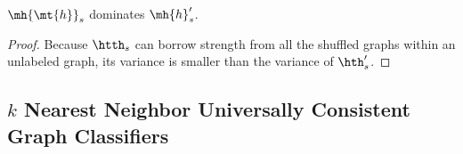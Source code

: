 \documentclass[10pt,journal,cspaper,compsoc]{IEEEtran}
\begin{document}
\begin{thm} \label{thm:tdomp}
	$\mh{\mt{h}}_s$ dominates $\mh{h}_s'$. 	
\end{thm}
\begin{proof}
Because $\htth_s$ can borrow strength from all the shuffled graphs within an unlabeled graph, its variance is smaller than the variance of $\hth_s'$.  
\end{proof}




\subsection{$k$ Nearest Neighbor Universally Consistent Graph Classifiers} %
\label{sec:a_practical_approach_to_unlabeled_graph_classification}
\end{document}
